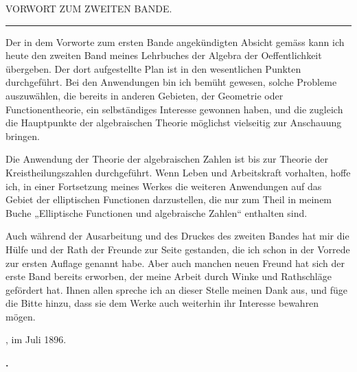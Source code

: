 \begin{center}
{\large VORWORT ZUM ZWEITEN BANDE.}

\vspace{8pt}
\rule{2.5cm}{0.4pt}
\end{center}

\vspace{6pt}

Der in dem Vorworte zum ersten Bande angekündigten Absicht gemäss kann ich heute den zweiten Band meines Lehrbuches der Algebra der Oeffentlichkeit übergeben. Der dort aufgestellte Plan ist in den wesentlichen Punkten durchgeführt. Bei den Anwendungen bin ich bemüht gewesen, solche Probleme auszuwählen, die bereits in anderen Gebieten, der Geometrie oder Functionentheorie, ein selbständiges Interesse gewonnen haben, und die zugleich die Hauptpunkte der algebraischen Theorie möglichst vielseitig zur Anschauung bringen.

Die Anwendung der Theorie der algebraischen Zahlen ist bis zur Theorie der Kreistheilungszahlen durchgeführt. Wenn Leben und Arbeitskraft vorhalten, hoffe ich, in einer Fortsetzung meines Werkes die weiteren Anwendungen auf das Gebiet der elliptischen Functionen darzustellen, die nur zum Theil in meinem Buche „Elliptische Functionen und algebraische Zahlen“ enthalten sind.

Auch während der Ausarbeitung und des Druckes des zweiten Bandes hat mir die Hülfe und der Rath der Freunde zur Seite gestanden, die ich schon in der Vorrede zur ersten Auflage genannt habe. Aber auch manchen neuen Freund hat sich der erste Band bereits erworben, der meine Arbeit durch Winke und Rathschläge gefördert hat. Ihnen allen spreche ich an dieser Stelle meinen Dank aus, und füge die Bitte hinzu, dass sie dem Werke auch weiterhin ihr Interesse bewahren mögen.

\bigskip

, im Juli 1896.

\begin{flushright}
\textbf{.}\hspace*{2em}
\end{flushright}
